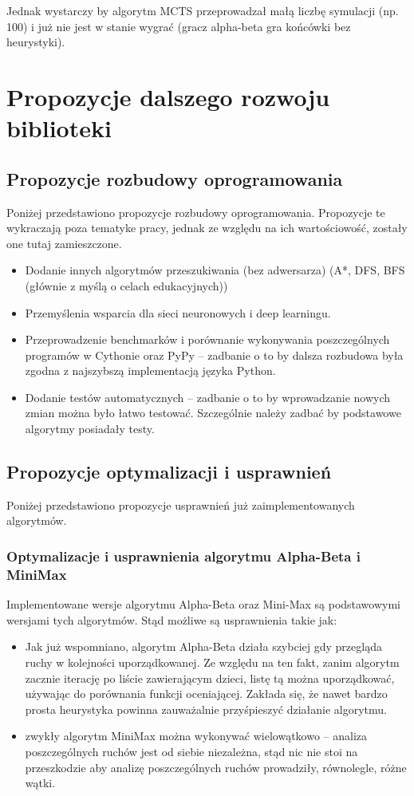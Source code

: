 \documentclass[polish,shortabstract,inz]{iithesis}
\begin{document}
Jednak wystarczy by algorytm MCTS przeprowadzał małą liczbę symulacji (np. 100) i już nie jest w stanie wygrać (gracz alpha-beta gra końcówki bez heurystyki).

\section{Propozycje dalszego rozwoju biblioteki}
\subsection{Propozycje rozbudowy oprogramowania}
Poniżej przedstawiono propozycje rozbudowy oprogramowania.
Propozycje te wykraczają poza tematyke pracy, jednak ze względu na ich wartościowość, zostały one tutaj zamieszczone.
\begin{itemize}
  \item Dodanie innych algorytmów przeszukiwania (bez adwersarza) (A*, DFS, BFS (głównie z myślą o celach edukacyjnych))
  \item Przemyślenia wsparcia dla sieci neuronowych i deep learningu.
  \item Przeprowadzenie benchmarków i porównanie wykonywania poszczególnych programów w Cythonie\cite{cython} oraz PyPy\cite{pypy} -- zadbanie o to by dalsza rozbudowa była zgodna z najszybszą implementacją języka Python.
  \item Dodanie testów automatycznych -- zadbanie o to by wprowadzanie nowych zmian można było łatwo testować. Szczególnie należy zadbać by podstawowe algorytmy posiadały testy.
\end{itemize}

\subsection{Propozycje optymalizacji i usprawnień}
Poniżej przedstawiono propozycje usprawnień już zaimplementowanych algorytmów.

\subsubsection{Optymalizacje i usprawnienia algorytmu Alpha-Beta i MiniMax}
Implementowane wersje algorytmu Alpha-Beta oraz Mini-Max są podstawowymi wersjami tych algorytmów.
Stąd możliwe są usprawnienia takie jak:
\begin{itemize}
  \item Jak już wspomniano, algorytm Alpha-Beta działa szybciej gdy przegląda ruchy w kolejności uporządkowanej.
    Ze względu na ten fakt, zanim algorytm zacznie iterację po liście zawierającym dzieci, listę tą można uporządkować, używając do porównania funkcji oceniającej.
    Zakłada się, że nawet bardzo prosta heurystyka powinna zauważalnie przyśpieszyć działanie algorytmu.
  \item zwykły algorytm MiniMax można wykonywać wielowątkowo -- analiza poszczególnych ruchów jest od siebie niezależna, stąd nic nie stoi na przeszkodzie aby analizę poszczególnych ruchów prowadziły, równolegle, różne wątki.
\end{itemize}
\end{document}
